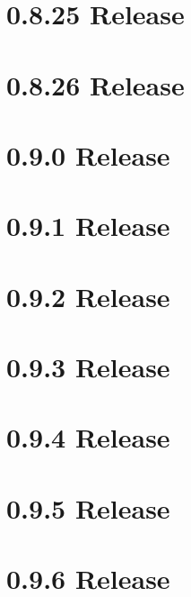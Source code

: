 \let\mypdfximage\pdfximage\def\pdfximage{\immediate\mypdfximage}\documentclass[twoside]{book}
\newcommand{\+}{\discretionary{\mbox{\scriptsize$\hookleftarrow$}}{}{}}
\begin{document}
\chapter{0.8.25 Release}
\label{doc_news_2018-11-18_0_8_25_md}

\chapter{0.8.26 Release}
\label{doc_news_2019-02-26_0_8_26_md}

\chapter{0.9.0 Release}
\label{doc_news_2019-08-06_0_9_0_md}

\chapter{0.9.1 Release}
\label{doc_news_2019-11-26_0_9_1_md}

\chapter{0.9.2 Release}
\label{doc_news_2020-05-26_0_9_2_md}

\chapter{0.9.3 Release}
\label{doc_news_2020-10-30_0_9_3_md}

\chapter{0.9.4 Release}
\label{doc_news_2021-02-01_0_9_4_md}

\chapter{0.9.5 Release}
\label{doc_news_2021-04-12_0_9_5_md}

\chapter{0.9.6 Release}
\label{doc_news_2021-06-07_0_9_6_md}

\end{document}
